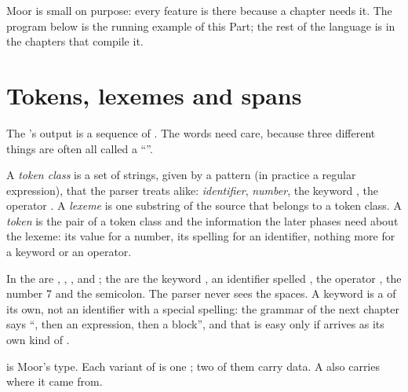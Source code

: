 Moor is small on purpose: every feature is there because a chapter needs it. The program below is the running example of this Part; the rest of the language is in the chapters that compile it.

\label{lst:b3:lexical-analysis:hello}

\section{Tokens, lexemes and spans}\label{sec:b3:lexical-analysis:tokens}

The 's output is a sequence of . The words need care, because three different things are often all called a ``''.

\begin{definition}\label{def:b3:lexical-analysis:token}
A \emph{token class} is a set of strings, given by a pattern (in practice a regular expression), that the parser treats alike: \emph{identifier}, \emph{number}, the keyword , the operator \code{<=}. A \emph{lexeme} is one substring of the source that belongs to a token class. A \emph{token} is the pair of a token class and the information the later phases need about the lexeme: its value for a number, its spelling for an identifier, nothing more for a keyword or an operator.
\end{definition}

In  the  are , , \code{=},  and \code{;}; the  are the keyword , an identifier spelled , the operator \code{=}, the number 7 and the semicolon. The parser never sees the spaces. A keyword is a  of its own, not an identifier with a special spelling: the grammar of the next chapter says ``, then an expression, then a block'', and that is easy only if  arrives as its own kind of .

 is Moor's  type. Each variant of  is one ; two of them carry data. A  also carries where it came from.

